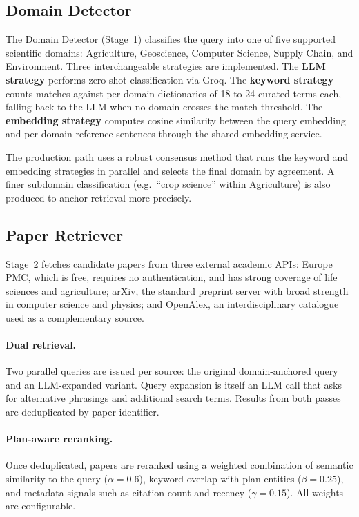 \documentclass[11pt,a4paper]{article}
\begin{document}
\subsection{Domain Detector}

The Domain Detector (Stage~1) classifies the query into one of five supported
scientific domains: Agriculture, Geoscience, Computer Science, Supply Chain,
and Environment. Three interchangeable strategies are implemented. The
\textbf{LLM strategy} performs zero-shot classification via Groq. The
\textbf{keyword strategy} counts matches against per-domain dictionaries of
18 to 24 curated terms each, falling back to the LLM when no domain crosses
the match threshold. The \textbf{embedding strategy} computes cosine
similarity between the query embedding and per-domain reference sentences
through the shared embedding service.

The production path uses a robust consensus method that runs the keyword and
embedding strategies in parallel and selects the final domain by agreement.
A finer subdomain classification (e.g.\ ``crop science'' within Agriculture)
is also produced to anchor retrieval more precisely.

\subsection{Paper Retriever}

Stage~2 fetches candidate papers from three external academic APIs:
Europe PMC, which is free, requires no authentication, and has strong
coverage of life sciences and agriculture; arXiv, the standard preprint
server with broad strength in computer science and physics; and OpenAlex,
an interdisciplinary catalogue used as a complementary source.

\paragraph{Dual retrieval.}
Two parallel queries are issued per source: the original domain-anchored query
and an LLM-expanded variant. Query expansion is itself an LLM call that asks
for alternative phrasings and additional search terms. Results from both
passes are deduplicated by paper identifier.

\paragraph{Plan-aware reranking.}
Once deduplicated, papers are reranked using a weighted combination of
semantic similarity to the query ($\alpha = 0.6$), keyword overlap with plan
entities ($\beta = 0.25$), and metadata signals such as citation count and
recency ($\gamma = 0.15$). All weights are configurable.
\end{document}
